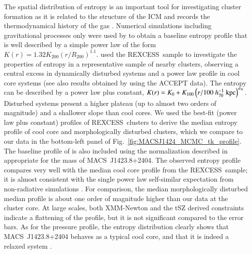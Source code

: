 \documentclass[twocolumn,traditabstract]{aa}
\newcommand{\rexcess}{{\gwpfont REXCESS}}
\begin{document}
The spatial distribution of entropy is an important tool for investigating cluster formation as it is related to the structure of the ICM and records the thermodynamical history of the gas \citep[see][for a review]{voit2005}. Numerical simulations including gravitational processes only were used by \cite{voit2005b} to obtain a baseline entropy profile that is well described by a simple power law of the form $K(r) = 1.32 K_{200} \left(r/R_{200}\right)^{1.1}$. \cite{pratt2010}  used the \rexcess\ sample to investigate the properties of entropy in a representative sample of nearby clusters, observing a central excess in dynamically disturbed systems and a power law profile in cool core systems (see also results obtained by \cite{cavagnolo2009} using the ACCEPT data). The entropy can be described by a power law plus constant, $K(r) = K_0+K_{100} \left(r/100 \ h_{70}^{-1} \ {\rm kpc}\right)^{\alpha_{K}}$. Disturbed systems present a higher plateau (up to almost two orders of magnitude) and a shallower slope than cool cores. We used the best-fit (power law plus constant) profiles of \rexcess\ clusters \citep[see Tab.~3 of][]{pratt2010} to derive the median entropy profile of cool core and morphologically disturbed clusters, which we compare to our data in the bottom-left panel of Fig.~\ref{fig:MACSJ1424_MCMC_tk_profile}. The baseline profile of \cite{voit2005b} is also included using the normalization described in \cite{pratt2010} appropriate for the mass of \mbox{MACS~J1423.8+2404}. The observed entropy profile compares very well with the median cool core profile from the \rexcess\ sample; it is almost consistent with the single power law self-similar expectation from non-radiative simulations \citep{voit2005b}. For comparison, the median morphologically disturbed median profile is about one order of magnitude higher than our data at the cluster core. At large scales, both XMM-Newton and the tSZ derived constraints indicate a flattening of the profile, but it is not significant compared to the error bars. As for the pressure profile, the entropy distribution clearly shows that \mbox{MACS~J1423.8+2404} behaves as a typical cool core, and that it is indeed a relaxed system \citep[as discussed in Sect.~\ref{sec:Introduction}, e.g.][]{kartaltepe2008,limousin2010}. 
\end{document}
